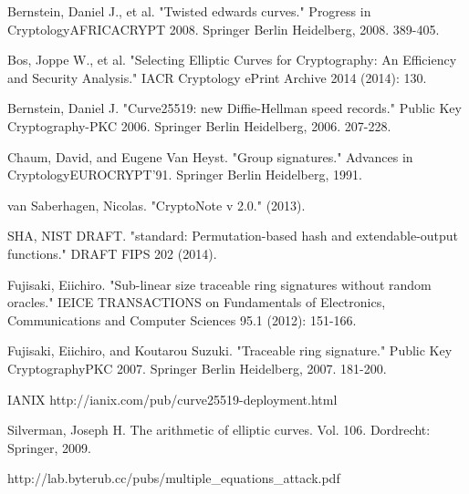 \documentclass[12pt,english]{mrl}
\numberwithin{equation}{section}
\numberwithin{figure}{section}
\begin{document}
\begin{thebibliography}{BBJLP}
 Bernstein, Daniel J., et al. "Twisted
edwards curves." Progress in Cryptology\textendash{}AFRICACRYPT
2008. Springer Berlin Heidelberg, 2008. 389-405.

 Bos, Joppe W., et al. "Selecting
Elliptic Curves for Cryptography: An Efficiency and Security Analysis."
IACR Cryptology ePrint Archive 2014 (2014): 130.

 Bernstein, Daniel J. "Curve25519:
new Diffie-Hellman speed records." Public Key Cryptography-PKC
2006. Springer Berlin Heidelberg, 2006. 207-228.

 Chaum, David, and Eugene Van Heyst. "Group
signatures." Advances in Cryptology\textemdash{}EUROCRYPT\textquoteright{}91.
Springer Berlin Heidelberg, 1991.

 van Saberhagen, Nicolas. "CryptoNote
v 2.0." (2013).

 SHA, NIST DRAFT. "standard: Permutation-based
hash and extendable-output functions." DRAFT FIPS 202
(2014).

 Fujisaki, Eiichiro. "Sub-linear size
traceable ring signatures without random oracles." IEICE
TRANSACTIONS on Fundamentals of Electronics, Communications and Computer
Sciences 95.1 (2012): 151-166.

 Fujisaki, Eiichiro, and Koutarou Suzuki. "Traceable
ring signature." Public Key Cryptography\textendash{}PKC
2007. Springer Berlin Heidelberg, 2007. 181-200.

 IANIX http://ianix.com/pub/curve25519-deployment.html

 Silverman, Joseph H. The arithmetic of elliptic
curves. Vol. 106. Dordrecht: Springer, 2009.

 http://lab.byterub.cc/pubs/multiple\_equations\_attack.pdf\end{thebibliography}
\end{document}
